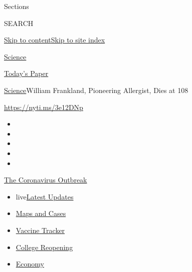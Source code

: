 Sections

SEARCH

\protect\hyperlink{site-content}{Skip to
content}\protect\hyperlink{site-index}{Skip to site index}

\href{https://www.nytimes3xbfgragh.onion/section/science}{Science}

\href{https://myaccount.nytimes3xbfgragh.onion/auth/login?response_type=cookie\&client_id=vi}{}

\href{https://www.nytimes3xbfgragh.onion/section/todayspaper}{Today's
Paper}

\href{/section/science}{Science}\textbar{}William Frankland, Pioneering
Allergist, Dies at 108

\url{https://nyti.ms/3e12DNp}

\begin{itemize}
\item
\item
\item
\item
\item
\end{itemize}

\href{https://www.nytimes3xbfgragh.onion/news-event/coronavirus?action=click\&pgtype=Article\&state=default\&region=TOP_BANNER\&context=storylines_menu}{The
Coronavirus Outbreak}

\begin{itemize}
\tightlist
\item
  live\href{https://www.nytimes3xbfgragh.onion/2020/08/04/world/coronavirus-covid-19.html?action=click\&pgtype=Article\&state=default\&region=TOP_BANNER\&context=storylines_menu}{Latest
  Updates}
\item
  \href{https://www.nytimes3xbfgragh.onion/interactive/2020/us/coronavirus-us-cases.html?action=click\&pgtype=Article\&state=default\&region=TOP_BANNER\&context=storylines_menu}{Maps
  and Cases}
\item
  \href{https://www.nytimes3xbfgragh.onion/interactive/2020/science/coronavirus-vaccine-tracker.html?action=click\&pgtype=Article\&state=default\&region=TOP_BANNER\&context=storylines_menu}{Vaccine
  Tracker}
\item
  \href{https://www.nytimes3xbfgragh.onion/2020/08/02/us/covid-college-reopening.html?action=click\&pgtype=Article\&state=default\&region=TOP_BANNER\&context=storylines_menu}{College
  Reopening}
\item
  \href{https://www.nytimes3xbfgragh.onion/live/2020/08/03/business/stock-market-today-coronavirus?action=click\&pgtype=Article\&state=default\&region=TOP_BANNER\&context=storylines_menu}{Economy}
\end{itemize}

